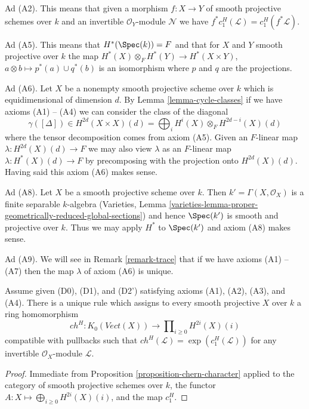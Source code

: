 \medskip\noindent
Ad (A2). This means that given a morphism $f : X \to Y$ of smooth projective
schemes over $k$ and an invertible $\mathcal{O}_Y$-module $\mathcal{N}$
we have $f^*c_1^H(\mathcal{L}) = c_1^H(f^*\mathcal{L})$.

\medskip\noindent
Ad (A5). This means that $H^*(\Spec(k)) = F$ and that for $X$ and $Y$ smooth
projective over $k$ the map $H^*(X) \otimes_F H^*(Y) \to H^*(X \times Y)$,
$a \otimes b \mapsto p^*(a) \cup q^*(b)$ is an isomorphism
where $p$ and $q$ are the projections.

\medskip\noindent
Ad (A6). Let $X$ be a nonempty smooth projective scheme over $k$
which is equidimensional of dimension $d$. By Lemma \ref{lemma-cycle-classes}
if we have axioms (A1) -- (A4) we can consider the class of the diagonal
$$
\gamma([\Delta]) \in
H^{2d}(X \times X)(d) = \bigoplus\nolimits_i H^i(X) \otimes_F H^{2d - i}(X)(d)
$$
where the tensor decomposition comes from axiom (A5).
Given an $F$-linear map $\lambda : H^{2d}(X)(d) \to F$ we may also view
$\lambda$ as an $F$-linear map $\lambda : H^*(X)(d) \to F$ by precomposing
with the projection onto $H^{2d}(X)(d)$. Having said this axiom (A6)
makes sense.

\medskip\noindent
Ad (A8). Let $X$ be a smooth projective scheme over $k$.
Then $k' = \Gamma(X, \mathcal{O}_X)$ is a finite separable
$k$-algebra (Varieties, Lemma
\ref{varieties-lemma-proper-geometrically-reduced-global-sections})
and hence $\Spec(k')$ is smooth and projective over $k$.
Thus we may apply $H^*$ to $\Spec(k')$ and axiom (A8) makes sense.

\medskip\noindent
Ad (A9). We will see in Remark \ref{remark-trace} that if we have
axioms (A1) -- (A7) then the map $\lambda$ of axiom (A6) is unique.

\begin{lemma}
\label{lemma-chern-classes}
Assume given (D0), (D1), and (D2') satisfying axioms (A1), (A2), (A3), and (A4).
There is a unique rule which assigns to every smooth projective $X$ over $k$
a ring homomorphism
$$
ch^H :
K_0(\textit{Vect}(X))
\longrightarrow
\prod\nolimits_{i \geq 0} H^{2i}(X)(i)
$$
compatible with pullbacks such that
$ch^H(\mathcal{L}) = \exp(c_1^H(\mathcal{L}))$
for any invertible $\mathcal{O}_X$-module $\mathcal{L}$.
\end{lemma}

\begin{proof}
Immediate from Proposition \ref{proposition-chern-character}
applied to the category of smooth projective schemes over $k$,
the functor $A : X \mapsto \bigoplus_{i \geq 0} H^{2i}(X)(i)$,
and the map $c_1^H$.
\end{proof}

